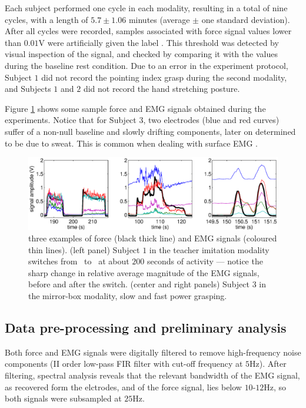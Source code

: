 Each subject performed one cycle in each modality, resulting in a total
of nine cycles, with a length of $5.7 \pm 1.06$ minutes (average
$\pm$ one standard deviation). After all cycles were recorded, samples
associated with force signal values lower than $0.01$V were artificially
given the label \re. This threshold was detected by visual inspection
of the signal, and checked by comparing it with the values during the 
baseline rest condition. Due to an error in the
experiment protocol, Subject $1$ did not record the pointing index
grasp during the second modality, and Subjects $1$ and $2$ did not
record the hand stretching posture.

Figure \ref{fig:examples} shows some sample force and EMG signals obtained
during the experiments. Notice that for Subject $3$, two electrodes (blue and
red curves) suffer of a non-null baseline and slowly drifting components,
later on determined to be due to sweat. This is common when dealing with
surface EMG \cite{deluca97,deluca02}.

\begin{figure}[!ht] \centering
  \includegraphics[width=\textwidth]{figs/figExamples}
  \caption{three examples of force (black thick line) and EMG
    signals (coloured thin lines). (left panel) Subject $1$ in the teacher imitation
    modality switches from \po\ to \pw\ at about $200$ seconds of activity --- notice
    the sharp change in relative average magnitude of the EMG signals, before and after
    the switch. (center and right panels) Subject $3$ in the mirror-box modality, slow
    and fast power grasping.}
  \label{fig:examples}
\end{figure}

\subsection{Data pre-processing and preliminary analysis}

Both force and EMG signals were digitally filtered
to remove high-frequency noise components (II order low-pass FIR filter
with cut-off frequency at $5$Hz). After filtering, spectral analysis
reveals that the relevant bandwidth of the
EMG signal, as recovered form the elctrodes, and of the force signal,
lies below $10$-$12$Hz, so both signals were subsampled at $25$Hz.

